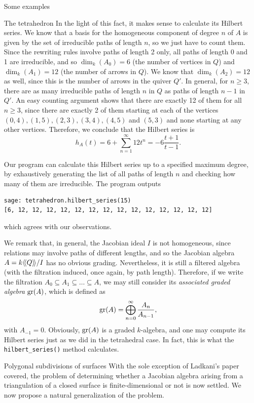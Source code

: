 \begin{chapter}{Some examples}
\begin{section}{The tetrahedron}
In the light of this fact, it makes sense to calculate its Hilbert series. We know that a basis for the homogeneous component of degree $n$ of $A$ is given by the set of irreducible paths of length $n$, so we just have to count them. Since the rewriting rules involve paths of length 2 only, all paths of length 0 and 1 are irreducible, and so $\dim_k(A_0)=6$ (the number of vertices in $Q$) and $\dim_k(A_1)=12$ (the number of arrows in $Q$). We know that $\dim_k(A_2)=12$ as well, since this is the number of arrows in the quiver $Q'$. In general, for $n\geq 3$, there are as many irreducible paths of length $n$ in $Q$ as paths of length $n-1$ in $Q'$. An easy counting argument shows that there are exactly 12 of them for all $n\geq 3$, since there are exactly 2 of them starting at each of the vertices $(0,4),(1,5), (2,3), (3,4), (4,5)$ and $(5,3)$ and none starting at any other vertices. Therefore, we conclude that the Hilbert series is
\[h_A(t)=6+\sum_{n=1}^\infty 12 t^n=-6\frac{t+1}{t-1}.\]

Our program can calculate this Hilbert series up to a specified maximum degree, by exhaustively generating the list of all paths of length $n$ and checking how many of them are irreducible. The program outputs
\begin{lstlisting}
sage: tetrahedron.hilbert_series(15)
[6, 12, 12, 12, 12, 12, 12, 12, 12, 12, 12, 12, 12, 12, 12]
\end{lstlisting}
which agrees with our observations.

\label{graded-alg}We remark that, in general, the Jacobian ideal $I$ is not homogeneous, since relations may involve paths of different lengths, and so the Jacobian algebra $A=k\langle\!\langle Q\rangle\!\rangle/I$ has no obvious grading. Nevertheless, it is still a filtered algebra (with the filtration induced, once again, by path length). Therefore, if we write the filtration $A_0\subseteq A_1\subseteq\dots\subseteq A$, we may still consider its \emph{associated graded algebra} $\operatorname{gr}(A)$, which is defined as
\[\operatorname{gr}(A) = \bigoplus_{n=0}^\infty \frac{A_n}{A_{n-1}},\]
with $A_{-1}=0$. Obviously, $\operatorname{gr}(A)$ is a graded $k$-algebra, and one may compute its Hilbert series just as we did in the tetrahedral case. In fact, this is what the \texttt{hilbert\_series()} method calculates.
\end{section}

\begin{section}{Polygonal subdivisions of surfaces}
With the sole exception of Ladkani's paper covered, the problem of determining whether a Jacobian algebra arising from a triangulation of a closed surface is finite-dimensional or not is now settled. We now propose a natural generalization of the problem.


\end{section}
\end{chapter}
